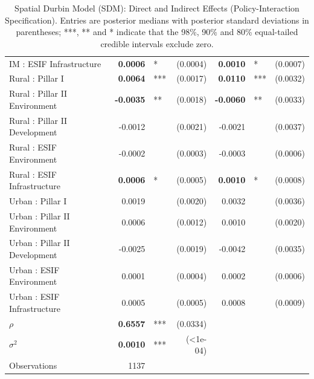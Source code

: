 \begin{table}[ht]
\begin{tabular}{l@{~~}rl@{~}r@{~~~~~}rl@{~}r}
  IM : ESIF Infrastructure & \textbf{0.0006} & * & (0.0004) & \textbf{0.0010} & * & (0.0007) \\ 
  Rural : Pillar I & \textbf{0.0064} & *** & (0.0017) & \textbf{0.0110} & *** & (0.0032) \\ 
  Rural : Pillar II Environment & \textbf{-0.0035} & ** & (0.0018) & \textbf{-0.0060} & ** & (0.0033) \\ 
  Rural : Pillar II Development & -0.0012 &  & (0.0021) & -0.0021 &  & (0.0037) \\ 
  Rural : ESIF Environment & -0.0002 &  & (0.0003) & -0.0003 &  & (0.0006) \\ 
  Rural : ESIF Infrastructure & \textbf{0.0006} & * & (0.0005) & \textbf{0.0010} & * & (0.0008) \\ 
  Urban : Pillar I & 0.0019 &  & (0.0020) & 0.0032 &  & (0.0036) \\ 
  Urban : Pillar II Environment & 0.0006 &  & (0.0012) & 0.0010 &  & (0.0020) \\ 
  Urban : Pillar II Development & -0.0025 &  & (0.0019) & -0.0042 &  & (0.0035) \\ 
  Urban : ESIF Environment & 0.0001 &  & (0.0004) & 0.0002 &  & (0.0006) \\ 
  Urban : ESIF Infrastructure & 0.0005 &  & (0.0005) & 0.0008 &  & (0.0009) \\ 
   \midrule
$\rho$ & \textbf{0.6557} & *** & (0.0334) &  &  &  \\ 
  $\sigma^2$ & \textbf{0.0010} & *** & (<1e-04) &  &  &  \\ 
  Observations & 1137 &  &  &  &  &  \\ 
   \bottomrule
\end{tabular}
\caption{Spatial Durbin Model (SDM): Direct and Indirect Effects (Policy-Interaction Specification). Entries are posterior medians with posterior standard deviations in parentheses; ***, ** and * indicate that the 98\%, 90\% and 80\% equal-tailed credible intervals exclude zero.} 
\label{tab:sdm_robustness}
\end{table}

